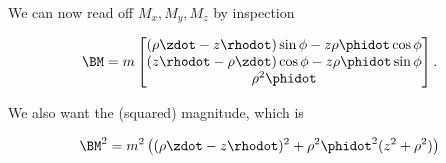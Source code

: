 We can now read off $M_x, M_y, M_z$ by inspection

\begin{equation}\label{eqn:classicalMechanicsPs2:150}
\BM =
m
\begin{bmatrix}
(\rho \zdot 
- z \rhodot )\sin\phi
- z \rho \phidot \cos\phi
\\
( z \rhodot 
- \rho \zdot ) \cos\phi
- z \rho \phidot \sin\phi
\\
\rho^2 \phidot
\end{bmatrix}.
\end{equation}

We also want the (squared) magnitude, which is

\begin{equation}\label{eqn:classicalMechanicsPs2:170}
\BM^2
=
m^2 \left(
(\rho \zdot - z \rhodot )^2 
+ \rho^2 \phidot^2 ( z^2 + \rho^2 )
\right)
\end{equation}

\EndNoBibArticle
